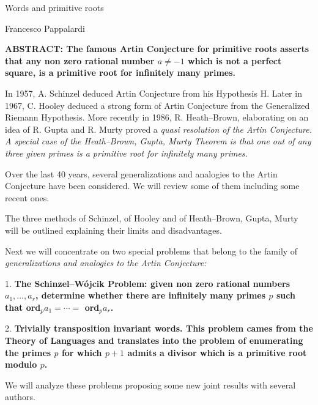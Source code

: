 \centerline{Words and primitive roots}\smallskip
\centerline{Francesco Pappalardi}\bigskip

\noindent\bf ABSTRACT: \rm The famous Artin Conjecture for primitive roots asserts that any non zero rational number $a\neq -1$ which
is not a perfect square, is a primitive root for infinitely many primes.

In 1957, A. Schinzel deduced Artin Conjecture from his Hypothesis H. Later in 1967, C. Hooley deduced a
strong form of Artin Conjecture from the Generalized Riemann Hypothesis. More recently in 1986, R. Heath--Brown,
elaborating on an idea of R. Gupta and R. Murty proved a \it quasi resolution \rm of the Artin Conjecture.
A special case of the Heath--Brown, Gupta, Murty Theorem is that one out of any three given primes is a primitive
root for infinitely many primes.

Over the last 40 years, several generalizations and analogies to the Artin Conjecture have been considered. 
We will review some of them including some recent ones.

The three methods of Schinzel, of Hooley and of Heath--Brown, Gupta, Murty will be outlined explaining their limits and 
disadvantages.

Next we will concentrate on two special problems that belong to the family of \it generalizations and analogies to the Artin Conjecture:\rm
\medskip
\item{1.} \bf The Schinzel--W\'ojcik Problem: \rm given non zero rational numbers $a_1,\ldots,a_r$, determine whether there
are infinitely many primes $p$ such that ord$_pa_1=\cdots=$ ord$_pa_r$.

\item{2.} \bf Trivially transposition invariant words. \rm This problem cames from the Theory of Languages and translates into the
problem of enumerating the primes $p$ for which $p+1$ admits a divisor which
is a primitive root modulo $p$.\medskip

We will analyze these problems proposing some new joint results with several authors.
\bye